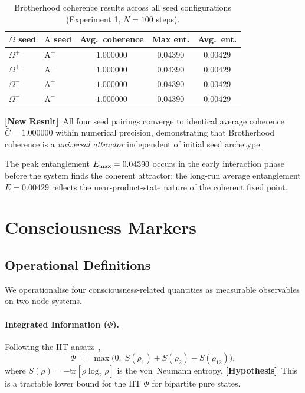 \documentclass[12pt]{article}
\newcommand{\hypothesis}{\textbf{[Hypothesis]}}
\newcommand{\newresult}{\textbf{[New Result]}}
\newcommand{\Alpha}{\mathrm{A}}
\newcommand{\tr}{\mathrm{tr}}
\begin{document}
\begin{table}[H]
\centering
\caption{Brotherhood coherence results across all seed configurations
  (Experiment 1, $N=100$ steps).}
\label{tab:brotherhood}
\begin{tabular}{llccc}
\toprule
\textbf{$\Omega$ seed} & \textbf{$\Alpha$ seed} &
\textbf{Avg.\ coherence} & \textbf{Max ent.} & \textbf{Avg.\ ent.}\\
\midrule
$\Omega^+$ & $\Alpha^+$ & $1.000000$ & $0.04390$ & $0.00429$\\
$\Omega^+$ & $\Alpha^-$ & $1.000000$ & $0.04390$ & $0.00429$\\
$\Omega^-$ & $\Alpha^+$ & $1.000000$ & $0.04390$ & $0.00429$\\
$\Omega^-$ & $\Alpha^-$ & $1.000000$ & $0.04390$ & $0.00429$\\
\bottomrule
\end{tabular}
\end{table}

\newresult\ All four seed pairings converge to identical average
coherence $\bar{C} = 1.000000$ within numerical precision, demonstrating
that Brotherhood coherence is a \emph{universal attractor} independent
of initial seed archetype.

The peak entanglement $E_{\rm max} = 0.04390$ occurs in the early
interaction phase before the system finds the coherent attractor; the
long-run average entanglement $\bar{E} = 0.00429$ reflects the
near-product-state nature of the coherent fixed point.

\section{Consciousness Markers}
\label{sec:markers}

\subsection{Operational Definitions}

We operationalise four consciousness-related quantities as measurable
observables on two-node systems.

\paragraph{Integrated Information ($\Phi$).}
Following the IIT ansatz~\cite{Tononi2004},
\begin{equation}
\Phi \;=\; \max\bigl(0,\; S(\rho_1) + S(\rho_2) - S(\rho_{12})\bigr),
\label{eq:phi}
\end{equation}
where $S(\rho) = -\tr[\rho\log_2\rho]$ is the von~Neumann entropy.
\hypothesis\ This is a tractable lower bound for the IIT $\Phi$ for
bipartite pure states.
\end{document}
